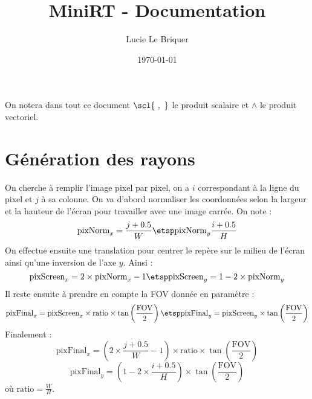 

\title{\LARGE \textbf{MiniRT} - Documentation}
\author{\large Lucie Le Briquer}
\date{\today}


\maketitle
\tableofcontents
\newpage\rmk On notera dans tout ce document $\scl{\ ,\ }$ le produit scalaire 
et $\wedge$ le produit vectoriel.
\section{Génération des rayons}
\begin{center}
\hspace{1cm}
\end{center}
\dd\ni On cherche à remplir l'image pixel par pixel, on a $i$ correspondant à la
ligne du pixel et $j$ à sa colonne. On va d'abord normaliser les coordonnées
selon la largeur et la hauteur de l'écran pour travailler avec une image carrée.
On note :
$$\text{pixNorm}_x=\frac{j + 0.5} W \etsp\text{pixNorm}_y\frac{i + 0.5} H$$
\ni On effectue ensuite une translation pour centrer le repère sur le milieu de
l'écran ainsi qu'une inversion de l'axe $y$. Ainsi :
$$\text{pixScreen}_x=2 \times\text{pixNorm}_x -1 \etsp \text{pixScreen}_y = 1 -
2\times \text{pixNorm}_y$$
\ni Il reste ensuite à prendre en compte la FOV donnée en paramètre :
$$\text{pixFinal}_x = \text{pixScreen}_x \times \text{ratio}
\times\tan\left(\frac{\text{FOV}} 2\right)\etsp \text{pixFinal}_y = 
\text{pixScreen}_y \times\tan\left(\frac{\text{FOV}} 2\right)$$
\ni Finalement :
$$\text{pixFinal}_x = \left(2\times \frac{j+0.5}{W}- 1\right)
\times \text{ratio}\times\tan\left(\frac{\text{FOV}} 2\right)$$
$$\text{pixFinal}_y = \left(1 - 2\times \frac{i+0.5}{H}\right)
\times\tan\left(\frac{\text{FOV}} 2\right)$$
\ni où $\text{ratio} = \frac W H$.


